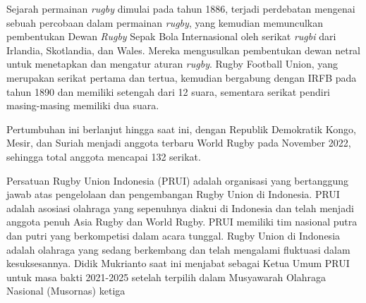 \documentclass[a4paper,twoside]{article}
\begin{document}


Sejarah permainan \textit{rugby} dimulai pada tahun 1886, terjadi perdebatan mengenai sebuah percobaan dalam permainan \textit{rugby}, yang kemudian memunculkan pembentukan Dewan \textit{Rugby} Sepak Bola Internasional oleh serikat \textit{rugbi} dari Irlandia, Skotlandia, dan Wales. Mereka mengusulkan pembentukan dewan netral untuk menetapkan dan mengatur aturan \textit{rugby}. Rugby Football Union, yang merupakan serikat pertama dan tertua, kemudian bergabung dengan IRFB pada tahun 1890 dan memiliki setengah dari 12 suara, sementara serikat pendiri masing-masing memiliki dua suara.


Pertumbuhan ini berlanjut hingga saat ini, dengan Republik Demokratik Kongo, Mesir, dan Suriah menjadi anggota terbaru World Rugby pada November 2022, sehingga total anggota mencapai 132 serikat.


Persatuan Rugby Union Indonesia (PRUI) adalah organisasi yang bertanggung jawab atas pengelolaan dan pengembangan Rugby Union di Indonesia. PRUI adalah asosiasi olahraga yang sepenuhnya diakui di Indonesia dan telah menjadi anggota penuh Asia Rugby dan World Rugby. PRUI memiliki tim nasional putra dan putri yang berkompetisi dalam acara tunggal. Rugby Union di Indonesia adalah olahraga yang sedang berkembang dan telah mengalami fluktuasi dalam kesuksesannya. Didik Mukrianto saat ini menjabat sebagai Ketua Umum PRUI untuk masa bakti 2021-2025 setelah terpilih dalam Musyawarah Olahraga Nasional (Musornas) ketiga
\end{document}
